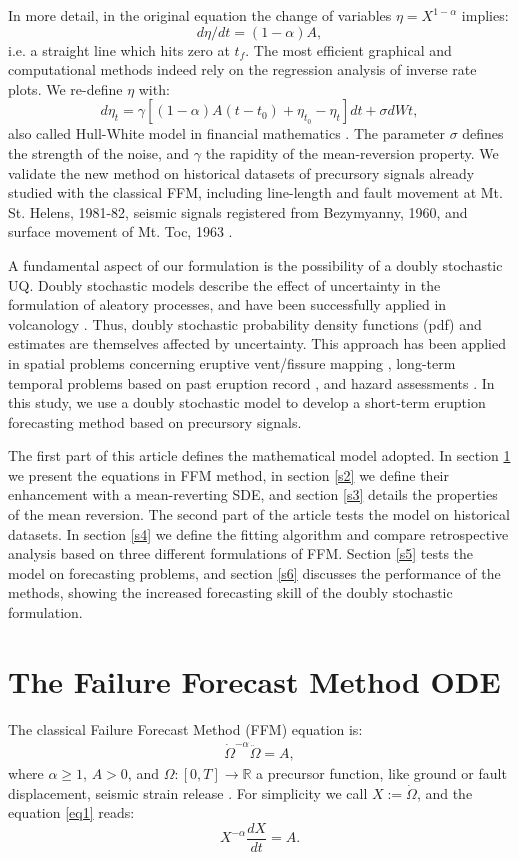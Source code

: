 \documentclass{article}
\begin{document}
In more detail, in the original equation the change of variables $\eta=X^{1-\alpha}$ implies:
$$d\eta/dt=(1-\alpha)A,$$
i.e. a straight line which hits zero at $t_f$. The most efficient graphical and computational methods indeed rely on the regression analysis of inverse rate plots. We re-define $\eta$ with:
$$d\eta_t=\gamma[(1-\alpha)A(t-t_0)+\eta_{t_0}-\eta_t]dt+\sigma dWt,$$
also called Hull-White model in financial mathematics \citep{HullWhite1990}. The parameter $\sigma$ defines the strength of the noise, and $\gamma$ the rapidity of the mean-reversion property. We validate the new method on historical datasets of precursory signals already studied with the classical FFM, including line-length and fault movement at Mt. St. Helens, 1981-82, seismic signals registered from Bezymyanny, 1960, and surface movement of Mt. Toc, 1963 \citep{Voight1988}.

A fundamental aspect of our formulation is the possibility of a doubly stochastic UQ. Doubly stochastic models describe the effect of uncertainty in the formulation of aleatory processes, and have been successfully applied in volcanology \citep{Sparks2004, Marzocchi2012, Bevilacqua2016}. Thus, doubly stochastic probability density functions (pdf) and estimates are themselves affected by uncertainty. This approach has been applied in spatial problems concerning eruptive vent/fissure mapping \citep{Selva2012, Bevilacqua2015, Tadini2017a, Tadini2017b, Bevilacqua2017a}, long-term temporal problems based on past eruption record \citep{Bebbington2013, Bevilacqua2016b, Richardson2017, Bevilacqua2018}, and hazard assessments \citep{Neri2015, Bevilacqua2017b}. In this study, we use a doubly stochastic model to develop a short-term eruption forecasting method based on precursory signals.

The first part of this article defines the mathematical model adopted. In section \ref{s1} we present the equations in FFM method, in section \ref{s2} we define their enhancement with a mean-reverting SDE, and section \ref{s3} details the properties of the mean reversion. The second part of the article tests the model on historical datasets. In section \ref{s4} we define the fitting algorithm and compare retrospective analysis based on three different formulations of FFM. Section \ref{s5} tests the model on forecasting problems, and section \ref{s6} discusses the performance of the methods, showing the increased forecasting skill of the doubly stochastic formulation.

\section{The Failure Forecast Method ODE}\label{s1}
The classical Failure Forecast Method (FFM) equation is:
\begin{align}\label{eq1}
\dot\Omega^{-\alpha}\ddot{\Omega}=A,
\end{align}
where $\alpha\ge 1$, $A>0$, and $\Omega:[0,T]\rightarrow \mathbb R$ a precursor function, like ground or fault displacement, seismic strain release \citep{Voight1988}. For simplicity we call $X:=\dot\Omega$, and the equation \ref{eq1} reads:
$$X^{-\alpha}\frac{dX}{dt}=A.$$
\end{document}
